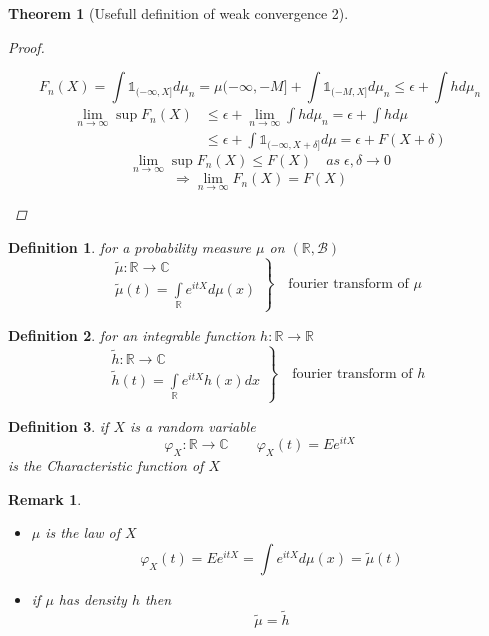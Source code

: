 \documentclass[12pt]{article}
\def\CC{\mathbb{C}}
\def\RR{\mathbb{R}}
\newtheorem{theorem}{Theorem}[section]
\newtheorem{definition}{Definition}[section]
\newtheorem*{remark}{Remark}
\begin{document}
\begin{theorem}[Usefull definition of weak convergence 2]
\begin{proof}
\begin{enumerate}[(a)]
\[F_n(X) = \int{\mathbb 1}_{(-\infty, X]}d\mu_n = \mu(-\infty, -M] +  \int{\mathbb 1}_{(-M, X]}d\mu_n  \leq \epsilon + \int h d\mu_n\]
\begin{align*}
\lim_{n\rightarrow \infty}\sup F_n(X) &\leq \epsilon + \lim_{n \rightarrow \infty} \int h d\mu_n  = \epsilon +  \int h d\mu\\
&\leq \epsilon + \int{\mathbb 1}_{(-\infty, X + \delta]}d\mu = \epsilon +F(X+\delta) \end{align*}
\[\boxed{\lim_{n\rightarrow \infty}\sup F_n(X) \leq F(X) \quad as\; \epsilon,\delta \rightarrow 0}\]
\[\Rightarrow \lim_{n\rightarrow \infty}F_n(X) = F(X)\]
\end{enumerate}
\end{proof}
\end{theorem}

\begin{definition}
for a probability measure $\mu$ on $(\RR, \mathcal{B})$
\[ \left.\begin{aligned}
&\tilde{\mu}:\RR \rightarrow \CC\\
&\tilde{\mu}(t) = \int\limits_{\RR}e^{itX}d\mu(x) \end{aligned} \right\} \quad \text{fourier transform of }\mu \]
\end{definition}

\begin{definition}
for an integrable function $h:\RR \rightarrow \RR$
\[ \left.\begin{aligned}
&\tilde{h}:\RR \rightarrow \CC\\
&\tilde{h}(t) = \int\limits_{\RR}e^{itX}h(x)dx \end{aligned} \right\} \quad \text{fourier transform of }h \]
\end{definition}

\begin{definition}
if $X$ is a random variable
\[\varphi_X:\RR \rightarrow \CC \qquad \varphi_X(t) = Ee^{itX}\]
is the Characteristic function of $X$
\end{definition}

\begin{remark}\quad \\
\begin{itemize}
\item $\mu$ is the law of $X$
\[ \varphi_X(t) = Ee^{itX} = \int e^{itX} d\mu(x) = \tilde{\mu}(t)\]
\item if $\mu$ has density $h$ then 
\[\tilde{\mu} = \tilde{h}\]
\end{itemize}
\end{remark}
\end{document}

